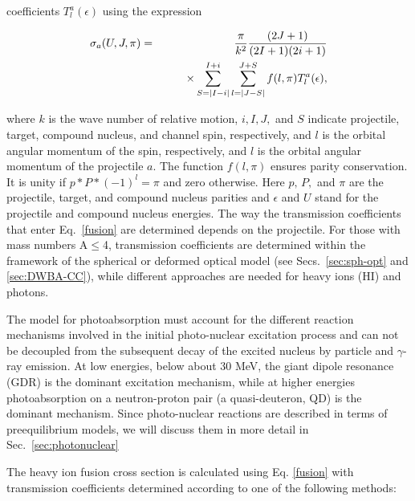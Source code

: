 coefficients $T_{l}^{a}(\epsilon)$ using the expression

\begin{eqnarray}
\sigma_{a}(U,J,\pi) & = & 
\frac{\pi}{k^{2}}\frac{(2J+1)}{(2I+1)(2i+1)}  \label{fusion} \\
& & \qquad\times
\sum_{S=|I-i|}^{I+i}\sum_{l=|J-S|}^{J+S}f(l,\pi)T_{l}^{a}(\epsilon),  \notag
\end{eqnarray}

\noindent where $k$ is the wave number of relative motion, $i,I,J,$ and $S$
indicate projectile, target, compound nucleus, and channel spin,
respectively, and $l$ is the orbital angular momentum of the spin,
respectively, and $l$ is the orbital angular momentum of the projectile $a$.
The function $f(l,\pi)$ ensures parity conservation. It is unity if $%
p*P*(-1)^{l}=\pi$ and zero otherwise. Here $p,\, P,$ and $\pi$ are the
projectile, target, and compound nucleus parities and $\epsilon$ and $U$
stand for the projectile and compound nucleus energies. The way the
transmission coefficients that enter Eq.~\ref{fusion} are determined depends
on the projectile. For those with mass numbers A$\leq$4, transmission
coefficients are determined within the framework of the spherical or
deformed optical model (see Secs.~\ref{sec:sph-opt} and \ref{sec:DWBA-CC}),
while different approaches are needed for heavy ions (HI) and photons.

The model for photoabsorption must account for the different reaction
mechanisms involved in the initial photo-nuclear excitation process and can
not be decoupled from the subsequent decay of the excited nucleus by
particle and $\gamma$-ray emission. At low energies, below about 30 MeV, the
giant dipole resonance (GDR) is the dominant excitation mechanism, while at
higher energies photoabsorption on a neutron-proton pair (a quasi-deuteron,
QD) is the dominant mechanism. Since photo-nuclear reactions are described
in terms of preequilibrium models, we will discuss them in more detail in
Sec.~\ref{sec:photonuclear}

The heavy ion fusion cross section is calculated using Eq. \ref{fusion} with
transmission coefficients determined according to one of the following
methods:

